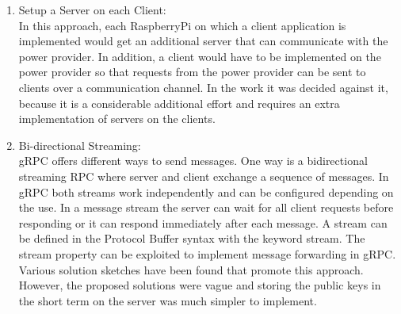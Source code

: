 \begin{enumerate}
\item Setup a Server on each Client:\\
In this approach, each RaspberryPi on which a client application is implemented would get an additional server that can communicate with the power provider. In addition, a client would have to be implemented on the power provider so that requests from the power provider can be sent to clients over a communication channel. In the work it was decided against it, because it is a considerable additional effort and requires an extra implementation of servers on the clients.
\item Bi-directional Streaming:\\
gRPC offers different ways to send messages. One way is a bidirectional streaming RPC where server and client exchange a sequence of messages. In gRPC both streams work independently and can be configured depending on the use.%
In a message stream the server can wait for all client requests before responding or it can respond immediately after each message.  A stream can be defined in the Protocol Buffer syntax with the keyword stream. The stream property can be exploited to implement message forwarding in gRPC. Various solution sketches have been found that promote this approach. However, the proposed solutions were vague and storing the public keys in the short term on the server was much simpler to implement. 

\end{enumerate}\\



\clearpage